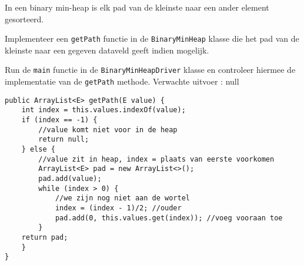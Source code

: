\begin{oef}
\code In een binary min-heap is elk pad van de kleinste naar een ander element gesorteerd. 

\begin{oefenumerate}
	
	\item Implementeer een \verb=getPath= functie in de \verb=BinaryMinHeap= klasse die het pad van de kleinste naar een gegeven dataveld geeft indien mogelijk.
	\item Run de \verb=main= functie in de \verb=BinaryMinHeapDriver= klasse en controleer hiermee de implementatie van de \verb=getPath= methode. \newline Verwachte uitvoer : \newline [1, 2, 3] \newline
[1, 2] \newline
null
\end{oefenumerate}
\begin{opl}
\begin{lstlisting}[caption={getPath methode}, label=minheapgetPath]
public ArrayList<E> getPath(E value) {
	int index = this.values.indexOf(value);
	if (index == -1) {
		//value komt niet voor in de heap
		return null;
	} else {
		//value zit in heap, index = plaats van eerste voorkomen
		ArrayList<E> pad = new ArrayList<>();
		pad.add(value);
		while (index > 0) {
			//we zijn nog niet aan de wortel
			index = (index - 1)/2; //ouder
			pad.add(0, this.values.get(index)); //voeg vooraan toe
		}
	return pad;	
	}
}
\end{lstlisting}
\end{opl}

\end{oef}



